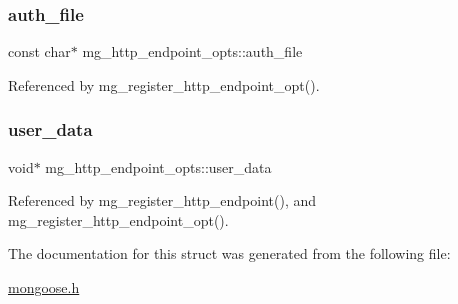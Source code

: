 \mbox{\label{structmg__http__endpoint__opts_a57ae875a1cc356870d396f3d864d2fc8_a57ae875a1cc356870d396f3d864d2fc8}} 
\subsubsection{\texorpdfstring{auth\+\_\+file}{auth\_file}}
{\footnotesize\ttfamily const char$\ast$ mg\+\_\+http\+\_\+endpoint\+\_\+opts\+::auth\+\_\+file}



Referenced by mg\+\_\+register\+\_\+http\+\_\+endpoint\+\_\+opt().

\mbox{\label{structmg__http__endpoint__opts_acdb6a63492d91f7e1c4f34242ba6be1d_acdb6a63492d91f7e1c4f34242ba6be1d}} 
\subsubsection{\texorpdfstring{user\+\_\+data}{user\_data}}
{\footnotesize\ttfamily void$\ast$ mg\+\_\+http\+\_\+endpoint\+\_\+opts\+::user\+\_\+data}



Referenced by mg\+\_\+register\+\_\+http\+\_\+endpoint(), and mg\+\_\+register\+\_\+http\+\_\+endpoint\+\_\+opt().



The documentation for this struct was generated from the following file\+:\begin{DoxyCompactItemize}
\item 
\hyperlink{mongoose_8h}{mongoose.\+h}\end{DoxyCompactItemize}
